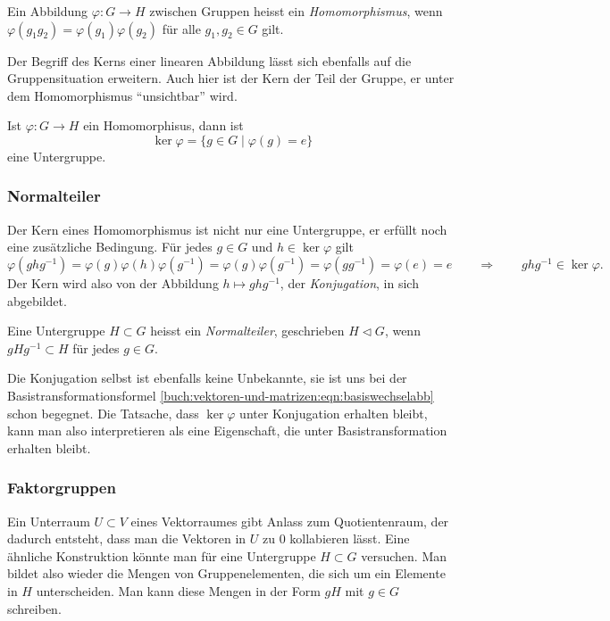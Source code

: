 \begin{definition}
\label{buch:gruppen:def:homomorphismus}
Ein Abbildung $\varphi\colon G\to H$ zwischen Gruppen heisst ein
{\em Homomorphismus}, wenn 
$\varphi(g_1g_2)=\varphi(g_1)\varphi(g_2)$ für alle $g_1,g_2\in G$ gilt.
%
\end{definition}

Der Begriff des Kerns einer linearen Abbildung lässt sich ebenfalls auf
die Gruppensituation erweitern.
Auch hier ist der Kern der Teil der Gruppe, er unter dem 
Homomorphismus ``unsichtbar'' wird.

\begin{definition}
Ist $\varphi\colon G\to H$ ein Homomorphisus, dann ist
\[
\ker\varphi
=
\{g\in G \mid \varphi(g)=e\}
\]
eine Untergruppe.
%
\end{definition}

\subsubsection{Normalteiler}
Der Kern eines Homomorphismus ist nicht nur eine Untergruppe, er erfüllt
noch eine zusätzliche Bedingung. 
Für jedes $g\in G$ und $h\in\ker\varphi$ gilt 
\[
\varphi(ghg^{-1})
=
\varphi(g)\varphi(h)\varphi(g^{-1})
=
\varphi(g)\varphi(g^{-1})
=
\varphi(gg^{-1})
=
\varphi(e)
=
e
\qquad\Rightarrow\qquad
ghg^{-1}\in\ker\varphi.
\]
Der Kern wird also von der Abbildung $h\mapsto ghg^{-1}$,
der {\em Konjugation}, in sich abgebildet.

\begin{definition}
Eine Untergruppe $H \subset G$ heisst ein {\em Normalteiler},
geschrieben $H \triangleleft G$,
wenn $gHg^{-1}\subset H$ für jedes $g\in G$.
%
\end{definition}

Die Konjugation selbst ist ebenfalls keine Unbekannte, sie ist uns
bei der Basistransformationsformel
\eqref{buch:vektoren-und-matrizen:eqn:basiswechselabb}
schon begegnet.
Die Tatsache, dass $\ker\varphi$ unter Konjugation erhalten bleibt,
kann man also interpretieren als eine Eigenschaft, die unter
Basistransformation erhalten bleibt.

\subsubsection{Faktorgruppen}
Ein Unterraum $U\subset V$ eines Vektorraumes gibt Anlass zum
Quotientenraum, der dadurch entsteht, dass man die Vektoren in $U$
zu $0$ kollabieren lässt.
Eine ähnliche Konstruktion könnte man für eine Untergruppe $H \subset G$
versuchen.
Man bildet also wieder die Mengen von Gruppenelementen, die sich um
ein Elemente in $H$ unterscheiden.
Man kann diese Mengen in der Form $gH$ mit $g\in G$ schreiben.

